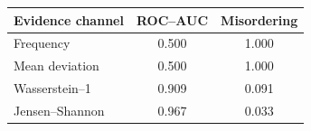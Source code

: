 \begin{tabular}{lcc}
\toprule
Evidence channel & ROC--AUC & Misordering \\
\midrule
Frequency & 0.500 & 1.000 \\
Mean deviation & 0.500 & 1.000 \\
Wasserstein--1 & 0.909 & 0.091 \\
Jensen--Shannon & 0.967 & 0.033 \\
\bottomrule
\end{tabular}
